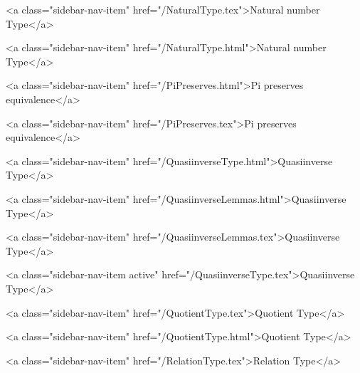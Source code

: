       
        
          <a class="sidebar-nav-item" href="/NaturalType.tex">Natural number Type</a>
        
      
    
      
        
          <a class="sidebar-nav-item" href="/NaturalType.html">Natural number Type</a>
        
      
    
      
        
          <a class="sidebar-nav-item" href="/PiPreserves.html">Pi preserves equivalence</a>
        
      
    
      
        
          <a class="sidebar-nav-item" href="/PiPreserves.tex">Pi preserves equivalence</a>
        
      
    
      
        
          <a class="sidebar-nav-item" href="/QuasiinverseType.html">Quasiinverse Type</a>
        
      
    
      
        
          <a class="sidebar-nav-item" href="/QuasiinverseLemmas.html">Quasiinverse Type</a>
        
      
    
      
        
          <a class="sidebar-nav-item" href="/QuasiinverseLemmas.tex">Quasiinverse Type</a>
        
      
    
      
        
          <a class="sidebar-nav-item active" href="/QuasiinverseType.tex">Quasiinverse Type</a>
        
      
    
      
        
          <a class="sidebar-nav-item" href="/QuotientType.tex">Quotient Type</a>
        
      
    
      
        
          <a class="sidebar-nav-item" href="/QuotientType.html">Quotient Type</a>
        
      
    
      
        
          <a class="sidebar-nav-item" href="/RelationType.tex">Relation Type</a>
        
